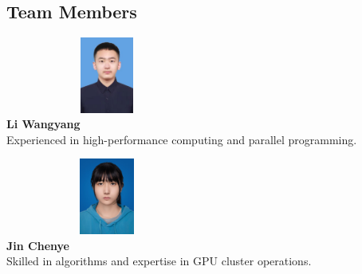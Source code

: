 \documentclass[a4paper,12pt]{article}
\begin{document}
\subsection{Team Members}
\begin{table}[H]
\centering
\begin{center}
    \begin{minipage}{0.45\textwidth}
        \centering
        \includegraphics[width=0.5\textwidth, height=2.5cm, keepaspectratio]{images/team/Li_Wangyang.png}\\[0.3cm]
        \textbf{Li Wangyang}\\[0.3cm]
        \small{Experienced in high-performance computing and parallel programming.}
    \end{minipage}
\begin{minipage}{0.45\textwidth}
    \centering
    \includegraphics[width=0.5\textwidth, height=2.5cm, keepaspectratio]{images/team/Jin_Chenye.png}\\[0.3cm]
    \textbf{Jin Chenye}\\[0.3cm]
    \small{Skilled in algorithms and expertise in GPU cluster operations.}
\end{minipage}

\vspace{1cm}


\end{center}
\end{table}
\end{document}
